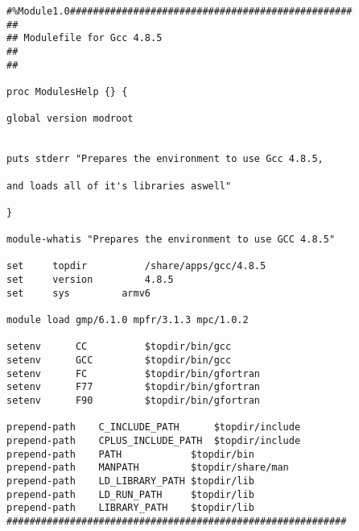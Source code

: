 \documentclass[]{article}
\begin{document}
                                                                                                                                                                                                                       \begin{lstlisting}
#%Module1.0#################################################
##
## Modulefile for Gcc 4.8.5
##
##
                                                                                                                                                                                                                       proc ModulesHelp {} {
                                                                                                                                                                                                                            global version modroot
                                                                                                                                                                                                                                    
                                                                                                                                                                                                                                    puts stderr "Prepares the environment to use Gcc 4.8.5,
                                                                                                                                                                                                                                                        and loads all of it's libraries aswell"
                                                                                                                                                                                                                       }

module-whatis "Prepares the environment to use GCC 4.8.5"

set     topdir          /share/apps/gcc/4.8.5
set     version         4.8.5
set     sys         armv6

module load gmp/6.1.0 mpfr/3.1.3 mpc/1.0.2

setenv      CC          $topdir/bin/gcc
setenv      GCC         $topdir/bin/gcc
setenv      FC          $topdir/bin/gfortran
setenv      F77         $topdir/bin/gfortran
setenv      F90         $topdir/bin/gfortran

prepend-path    C_INCLUDE_PATH      $topdir/include
prepend-path    CPLUS_INCLUDE_PATH  $topdir/include
prepend-path    PATH            $topdir/bin
prepend-path    MANPATH         $topdir/share/man
prepend-path    LD_LIBRARY_PATH $topdir/lib
prepend-path    LD_RUN_PATH     $topdir/lib
prepend-path    LIBRARY_PATH    $topdir/lib
###########################################################
\end{lstlisting}
\end{document}

